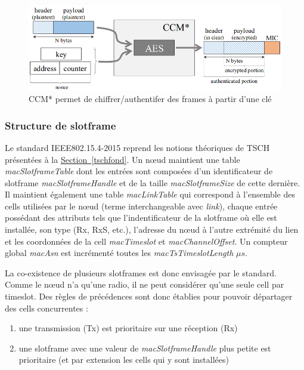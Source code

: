 \documentclass[]{report}
\newcommand{\wordlink}[2]{\hyperref[#2]{#1~\ref{#2}}}
\begin{document}
	\begin{figure}[!ht]
	\centering
	\includegraphics[width=0.7\linewidth]{CCM}
	\caption{CCM* permet de chiffrer/authentifer des frames à partir d'une clé \cite{link-layer-sec-impact}}
	\label{fig:CCM}
	\end{figure}

\newpage


\subsubsection{Structure de slotframe}

Le standard IEEE802.15.4-2015 \cite{IEEE802.15.4} reprend les notions théoriques de TSCH présentées à la \wordlink{Section}{tschfond}. Un nœud maintient une table \textit{macSlotframeTable} dont les entrées sont composées d'un identificateur de slotframe \textit{macSlotframeHandle} et de la taille \textit{macSlotframeSize} de cette dernière. Il maintient également une table \textit{macLinkTable} qui correspond à l'ensemble des cells utilisées par le nœud (terme interchangeable avec \textit{link}), chaque entrée possédant des attributs tels que l'indentificateur de la slotframe où elle est installée, son type (Rx, RxS, etc.), l'adresse du nœud à l'autre extrémité du lien et les coordonnées de la cell \textit{macTimeslot} et \textit{macChannelOffset}. Un compteur global \textit{macAsn} est incrémenté toutes les \textit{macTsTimeslotLength} $\mu s$.\\

\par La co-existence de plusieurs slotframes est donc envisagée par le standard. Comme le nœud n'a qu'une radio, il ne peut considérer qu'une seule cell par timeslot. Des règles de précédences sont donc établies pour pouvoir départager des cells concurrentes :
\vspace{0.1cm}
\begin{enumerate}
\item une transmission (Tx) est prioritaire sur une réception (Rx)
\vspace{0.1cm}
\item une slotframe avec une valeur de \textit{macSlotframeHandle} plus petite est prioritaire (et par extension les cells qui y sont installées)
\end{enumerate}
\end{document}
